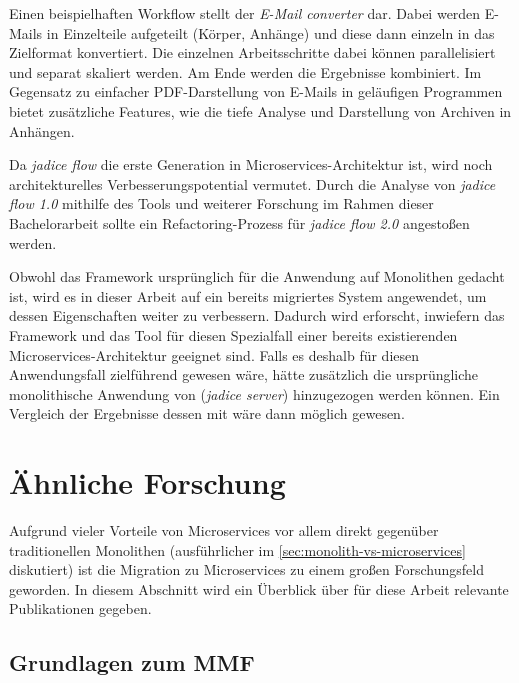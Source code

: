 Einen beispielhaften Workflow stellt der \emph{E-Mail converter} dar.
Dabei werden E-Mails in Einzelteile aufgeteilt (Körper, Anhänge) und diese dann einzeln in das Zielformat konvertiert.
Die einzelnen Arbeitsschritte dabei können parallelisiert und separat skaliert werden.
Am Ende werden die Ergebnisse kombiniert.
Im Gegensatz zu einfacher PDF-Darstellung von E-Mails in geläufigen Programmen bietet \jf zusätzliche Features, wie die tiefe Analyse und Darstellung von Archiven in Anhängen.

Da \emph{jadice flow} die erste Generation in Microservices-Architektur ist, wird noch architekturelles Verbesserungspotential vermutet.
Durch die Analyse von \emph{jadice flow 1.0} mithilfe des Tools und weiterer Forschung im Rahmen dieser Bachelorarbeit sollte ein Refactoring-Prozess für \emph{jadice flow 2.0} angestoßen werden.

Obwohl das Framework ursprünglich für die Anwendung auf Monolithen gedacht ist, wird es in dieser Arbeit auf ein bereits migriertes System angewendet, um dessen Eigenschaften weiter zu verbessern.
Dadurch wird erforscht, inwiefern das Framework und das Tool für diesen Spezialfall einer bereits existierenden Microservices-Architektur geeignet sind.
Falls es deshalb für diesen Anwendungsfall zielführend gewesen wäre, hätte zusätzlich die ursprüngliche monolithische Anwendung von \jf (\emph{jadice server}) hinzugezogen werden können.
Ein Vergleich der Ergebnisse dessen mit \jf wäre dann möglich gewesen.

\section{Ähnliche Forschung}

Aufgrund vieler Vorteile von Microservices vor allem direkt gegenüber traditionellen Monolithen (ausführlicher im \cref{sec:monolith-vs-microservices} diskutiert) ist die Migration zu Microservices zu einem großen Forschungsfeld geworden.
In diesem Abschnitt wird ein Überblick über für diese Arbeit relevante Publikationen gegeben.

\subsection{Grundlagen zum MMF}

